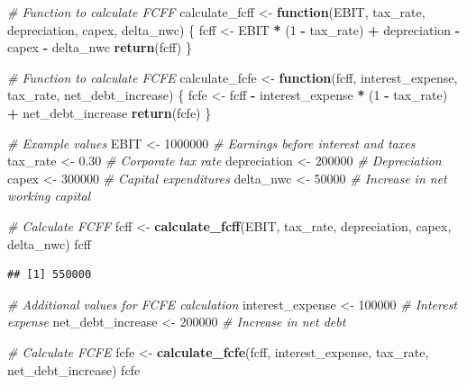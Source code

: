 \documentclass[
]{book}
\newenvironment{Shaded}{\begin{snugshade}}{\end{snugshade}}
\newcommand{\CommentTok}[1]{\textcolor[rgb]{0.56,0.35,0.01}{\textit{#1}}}
\newcommand{\ControlFlowTok}[1]{\textcolor[rgb]{0.13,0.29,0.53}{\textbf{#1}}}
\newcommand{\DecValTok}[1]{\textcolor[rgb]{0.00,0.00,0.81}{#1}}
\newcommand{\FloatTok}[1]{\textcolor[rgb]{0.00,0.00,0.81}{#1}}
\newcommand{\FunctionTok}[1]{\textcolor[rgb]{0.13,0.29,0.53}{\textbf{#1}}}
\newcommand{\NormalTok}[1]{#1}
\newcommand{\OtherTok}[1]{\textcolor[rgb]{0.56,0.35,0.01}{#1}}
\newcommand{\SpecialCharTok}[1]{\textcolor[rgb]{0.81,0.36,0.00}{\textbf{#1}}}
\begin{document}
\begin{Shaded}
\begin{Highlighting}[]
\CommentTok{\# Function to calculate FCFF}
\NormalTok{calculate\_fcff }\OtherTok{\textless{}{-}} \ControlFlowTok{function}\NormalTok{(EBIT, tax\_rate, depreciation, capex, delta\_nwc) \{}
\NormalTok{  fcff }\OtherTok{\textless{}{-}}\NormalTok{ EBIT }\SpecialCharTok{*}\NormalTok{ (}\DecValTok{1} \SpecialCharTok{{-}}\NormalTok{ tax\_rate) }\SpecialCharTok{+}\NormalTok{ depreciation }\SpecialCharTok{{-}}\NormalTok{ capex }\SpecialCharTok{{-}}\NormalTok{ delta\_nwc}
  \FunctionTok{return}\NormalTok{(fcff)}
\NormalTok{\}}

\CommentTok{\# Function to calculate FCFE}
\NormalTok{calculate\_fcfe }\OtherTok{\textless{}{-}} \ControlFlowTok{function}\NormalTok{(fcff, interest\_expense, tax\_rate, net\_debt\_increase) \{}
\NormalTok{  fcfe }\OtherTok{\textless{}{-}}\NormalTok{ fcff }\SpecialCharTok{{-}}\NormalTok{ interest\_expense }\SpecialCharTok{*}\NormalTok{ (}\DecValTok{1} \SpecialCharTok{{-}}\NormalTok{ tax\_rate) }\SpecialCharTok{+}\NormalTok{ net\_debt\_increase}
  \FunctionTok{return}\NormalTok{(fcfe)}
\NormalTok{\}}

\CommentTok{\# Example values}
\NormalTok{EBIT         }\OtherTok{\textless{}{-}} \DecValTok{1000000} \CommentTok{\# Earnings before interest and taxes}
\NormalTok{tax\_rate     }\OtherTok{\textless{}{-}} \FloatTok{0.30} \CommentTok{\# Corporate tax rate}
\NormalTok{depreciation }\OtherTok{\textless{}{-}} \DecValTok{200000} \CommentTok{\# Depreciation}
\NormalTok{capex        }\OtherTok{\textless{}{-}} \DecValTok{300000} \CommentTok{\# Capital expenditures}
\NormalTok{delta\_nwc    }\OtherTok{\textless{}{-}} \DecValTok{50000} \CommentTok{\# Increase in net working capital}

\CommentTok{\# Calculate FCFF}
\NormalTok{fcff }\OtherTok{\textless{}{-}} \FunctionTok{calculate\_fcff}\NormalTok{(EBIT, tax\_rate, depreciation, capex, delta\_nwc)}
\NormalTok{fcff}
\end{Highlighting}
\end{Shaded}

\begin{verbatim}
## [1] 550000
\end{verbatim}

\begin{Shaded}
\begin{Highlighting}[]
\CommentTok{\# Additional values for FCFE calculation}
\NormalTok{interest\_expense  }\OtherTok{\textless{}{-}} \DecValTok{100000} \CommentTok{\# Interest expense}
\NormalTok{net\_debt\_increase }\OtherTok{\textless{}{-}} \DecValTok{200000} \CommentTok{\# Increase in net debt}

\CommentTok{\# Calculate FCFE}
\NormalTok{fcfe }\OtherTok{\textless{}{-}} \FunctionTok{calculate\_fcfe}\NormalTok{(fcff, interest\_expense, tax\_rate, net\_debt\_increase)}
\NormalTok{fcfe}
\end{Highlighting}
\end{Shaded}
\end{document}
